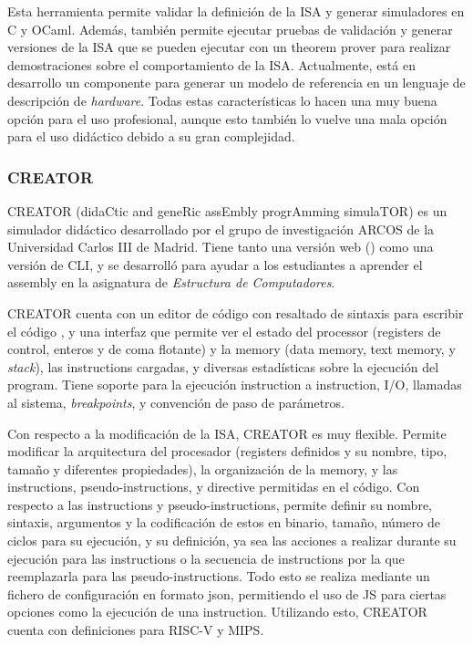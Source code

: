 Esta herramienta permite validar la definición de la \gls{ISA} y generar
simuladores en C y OCaml. Además, también permite ejecutar pruebas de validación
y generar versiones de la \gls{ISA} que se pueden ejecutar con un \gls{theorem
prover} para realizar demostraciones sobre el comportamiento de la \gls{ISA}.
Actualmente, está en desarrollo un componente para generar un modelo de
referencia en un lenguaje de descripción de \textit{hardware}. Todas estas
características lo hacen una muy buena opción para el uso profesional, aunque
esto también lo vuelve una mala opción para el uso didáctico debido a su gran
complejidad.

\subsubsection{CREATOR}

CREATOR (didaCtic and geneRic assEmbly progrAmming simulaTOR)
\parencite{CREATOR} es un simulador didáctico desarrollado por el grupo de
investigación ARCOS de la Universidad Carlos III de Madrid. Tiene tanto una
versión web () como una versión de \gls{CLI}, y se desarrolló
para ayudar a los estudiantes a aprender el \gls{assembly} en la asignatura de
\textit{Estructura de Computadores}.

CREATOR cuenta con un editor de código con resaltado de sintaxis para escribir
el código , y una interfaz que permite ver el
estado del \gls{processor} (\glspl{register} de control, enteros y de coma
flotante) y la \gls{memory} (\gls{data memory}, \gls{text memory}, y
\textit{stack}), las \glspl{instruction} cargadas, y diversas estadísticas sobre
la ejecución del \gls{program}. Tiene soporte para la ejecución
\gls{instruction} a \gls{instruction}, I/O, llamadas al sistema,
\textit{breakpoints}, y convención de paso de parámetros.

Con respecto a la modificación de la \gls{ISA}, CREATOR es muy flexible. Permite
modificar la arquitectura del procesador (\glspl{register} definidos y su
nombre, tipo, tamaño y diferentes propiedades), la organización de la
\gls{memory}, y las \glspl{instruction}, \glspl{pseudo-instruction}, y
\gls{directive} permitidas en el código. Con respecto a las \glspl{instruction}
y \glspl{pseudo-instruction}, permite definir su nombre, sintaxis, argumentos y
la codificación de estos en binario, tamaño, número de ciclos para su ejecución,
y su definición, ya sea las acciones a realizar durante su ejecución para las
\glspl{instruction} o la secuencia de \glspl{instruction} por la que
reemplazarla para las \glspl{pseudo-instruction}. Todo esto se realiza mediante
un fichero de configuración en formato \gls{json}, permitiendo el uso de
\gls{JS} para ciertas opciones como la ejecución de una \gls{instruction}.
Utilizando esto, CREATOR cuenta con definiciones para RISC-V y MIPS.


